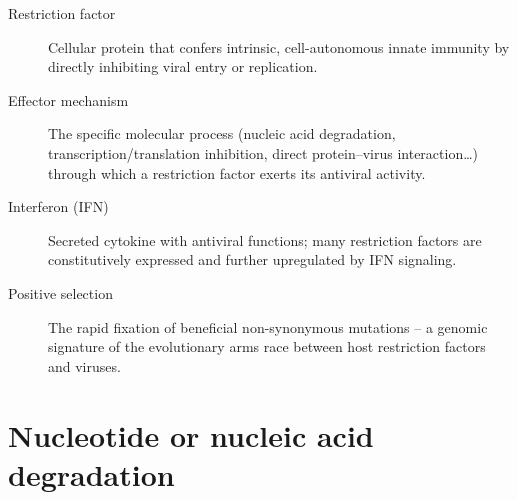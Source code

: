 \documentclass{enslyonreview}
\begin{document}
\begin{reviewbox}[!ht]
  \caption{\textbf{Key definitions.}}
  \label{box:definitions}
  \begin{description}
    \item[Restriction factor] Cellular protein that confers intrinsic,
      cell-autonomous innate immunity by directly inhibiting viral entry
      or replication.
    \item[Effector mechanism] The specific molecular process (nucleic
      acid degradation, transcription/translation inhibition, direct
      protein--virus interaction\ldots) through which a restriction
      factor exerts its antiviral activity.
    \item[Interferon (IFN)] Secreted cytokine with antiviral functions;
      many restriction factors are constitutively expressed and further
      upregulated by IFN signaling.
    \item[Positive selection] The rapid fixation of beneficial
      non-synonymous mutations -- a genomic signature of the evolutionary
      arms race between host restriction factors and viruses.
  \end{description}
\end{reviewbox}

\section{Nucleotide or nucleic acid degradation}
\end{document}
